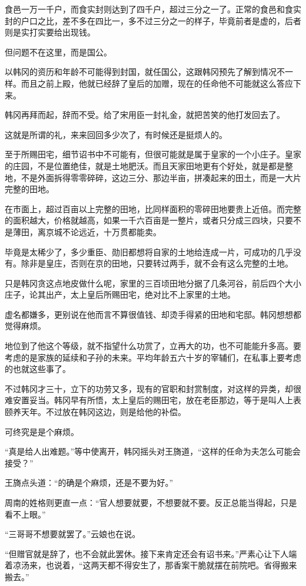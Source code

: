 食邑一万一千户，而食实封则达到了四千户，超过三分之一了。正常的食邑和食实封的户口之比，差不多在四比一，多不过三分之一的样子，毕竟前者是虚的，后者则是实打实要给出现钱。

但问题不在这里，而是国公。

以韩冈的资历和年龄不可能得到封国，就任国公，这跟韩冈预先了解到情况不一样。而且之前上殿，他就已经辞了皇后的加赠，现在的任命他不可能就这么答应下来。

韩冈再拜而起，辞而不受。给了宋用臣一封礼金，就把苦笑的他打发回去了。

这就是所谓的礼，来来回回多少次了，有时候还是挺烦人的。

至于所赐田宅，细节诏书中不可能有，但很可能就是属于皇家的一个小庄子。皇家的庄园，不是位置绝佳，就是土地肥沃。而且天家田地更有个好处，就是都是整地，不是外面拆得零零碎碎，这边三分、那边半亩，拼凑起来的田土，而是一大片完整的田地。

在市面上，超过百亩以上完整的田地，比同样面积的零碎田地要贵上近倍。而完整的面积越大，价格就越高，如果一千六百亩是一整片，或者只分成三四块，只要不是薄田，离京城不论远近，十万贯都能卖。

毕竟是太稀少了，多少重臣、勋旧都想将自家的土地给连成一片，可成功的几乎没有。除非是皇庄，否则在京的田地，只要转过两手，就不会有这么完整的土地。

只是韩冈贪这点地皮做什么呢，家里的三百顷田地分据了几条河谷，前后四个大小庄子，论其出产，太上皇后所赐田宅，绝对比不上家里的土地。

虚名都嫌多，更别说在他而言不算很值钱、却烫手得紧的田地和宅邸。韩冈想想都觉得麻烦。

地位到了他这个等级，就不指望什么功赏了，立再大的功，也不可能能升多高。要考虑的是家族的延续和子孙的未来。平均年龄五六十岁的宰辅们，在私事上要考虑的也就这些事了。

不过韩冈才三十，立下的功劳又多，现有的官职和封赏制度，对这样的异类，却很难安置妥当。韩冈早有所悟，太上皇后的赐田宅，放在老臣那边，等于是叫人上表颐养天年。不过放在韩冈这边，则是给他的补偿。

可终究是是个麻烦。

“真是给人出难题。”等中使离开，韩冈摇头对王旖道，“这样的任命为夫怎么可能会接受？”

王旖点头道：“的确是个麻烦，还是不要为好。”

周南的姓格则更直一点：“官人想要就要，不想要就不要。反正总能当得起，只是看不上眼。”

“三哥哥不想要就罢了。”云娘也在说。

“但赠官就是辞了，也不会就此罢休。接下来肯定还会有诏书来。”严素心让下人端着凉汤来，也说着，“这两天都不得安生了，那香案干脆就摆在前院吧。省得搬来搬去。”

